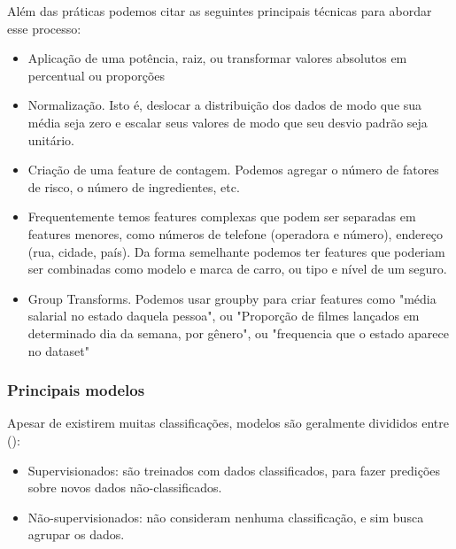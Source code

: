 Além das práticas podemos citar as seguintes principais técnicas para abordar esse processo:
\begin{itemize}
\item Aplicação de uma potência, raiz, ou transformar valores absolutos em percentual ou proporções
\item Normalização. Isto é, deslocar a distribuição dos dados de modo que sua média seja zero e escalar seus valores de modo que seu desvio padrão seja unitário. 
\item Criação de uma feature de contagem. Podemos agregar o número de fatores de risco, o número de ingredientes, etc.
\item Frequentemente temos features complexas que podem ser separadas em features menores, como números de telefone (operadora e número), endereço (rua, cidade, país). Da forma semelhante podemos ter features que poderiam ser combinadas como modelo e marca de carro, ou tipo e nível de um seguro.
\item Group Transforms. Podemos usar groupby para criar features como "média salarial no estado daquela pessoa", ou "Proporção de filmes lançados em determinado dia da semana, por gênero", ou "frequencia que o estado aparece no dataset"
\end{itemize}

\subsubsection{Principais modelos}
Apesar de existirem muitas classificações, modelos são geralmente divididos entre (\cite{SCRATCH,PRINCIPLES}):
\begin{itemize}
\item Supervisionados: são treinados com dados classificados, para fazer predições sobre novos dados não-classificados. 
\item Não-supervisionados: não consideram nenhuma classificação, e sim busca agrupar os dados. 
\end{itemize}

